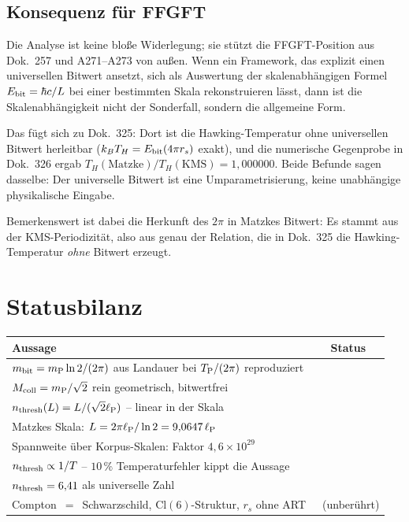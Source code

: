 \subsection{Konsequenz für FFGFT}

Die Analyse ist keine bloße Widerlegung; sie stützt die
FFGFT-Position aus Dok.~257 und A271--A273 von außen.
Wenn ein Framework, das explizit einen universellen Bitwert ansetzt,
sich als Auswertung der skalenabhängigen Formel $E_{\mathrm{bit}} = \hbar c/L$
bei einer bestimmten Skala rekonstruieren lässt, dann ist die
Skalenabhängigkeit nicht der Sonderfall, sondern die allgemeine Form.

Das fügt sich zu Dok.~325: Dort ist die Hawking-Temperatur ohne
universellen Bitwert herleitbar
($k_B T_H = E_{\mathrm{bit}}(4\pi r_s)$ exakt), und die numerische Gegenprobe
in Dok.~326 ergab $T_H(\text{Matzke})/T_H(\text{KMS}) = 1{,}000000$.
Beide Befunde sagen dasselbe: Der universelle Bitwert ist eine
Umparametrisierung, keine unabhängige physikalische Eingabe.

Bemerkenswert ist dabei die Herkunft des $2\pi$ in Matzkes Bitwert:
Es stammt aus der KMS-Periodizität, also aus genau der Relation, die
in Dok.~325 die Hawking-Temperatur \emph{ohne} Bitwert erzeugt.

\section{Statusbilanz}

\begin{center}
\begin{tabular}{@{}lc@{}}
  \toprule
  \textbf{Aussage} & \textbf{Status} \\
  \midrule
  $m_{\mathrm{bit}} = m_{\mathrm{P}}\ln 2/(2\pi)$ aus Landauer bei $T_{\mathrm{P}}/(2\pi)$ reproduziert & \B \\
  $M_{\mathrm{coll}} = m_{\mathrm{P}}/\sqrt{2}$ rein geometrisch, bitwertfrei & \B \\
  $n_{\mathrm{thresh}}(L) = L/(\sqrt{2}\ell_{\mathrm{P}})$ -- linear in der Skala & \B \\
  Matzkes Skala: $L = 2\pi\ell_{\mathrm{P}}/\ln 2 = 9{,}0647\,\ell_{\mathrm{P}}$ & \B \\
  Spannweite über Korpus-Skalen: Faktor $4{,}6\times10^{29}$ & \B \\
  $n_{\mathrm{thresh}} \propto 1/T$ -- $10\,\%$ Temperaturfehler kippt die Aussage & \B \\
  \midrule
  $n_{\mathrm{thresh}} = 6{,}41$ als universelle Zahl & \X \\
  Compton~$=$~Schwarzschild, $\mathrm{Cl}(6)$-Struktur, $r_s$ ohne ART & \B\ (unberührt) \\
  \bottomrule
\end{tabular}
\end{center}

